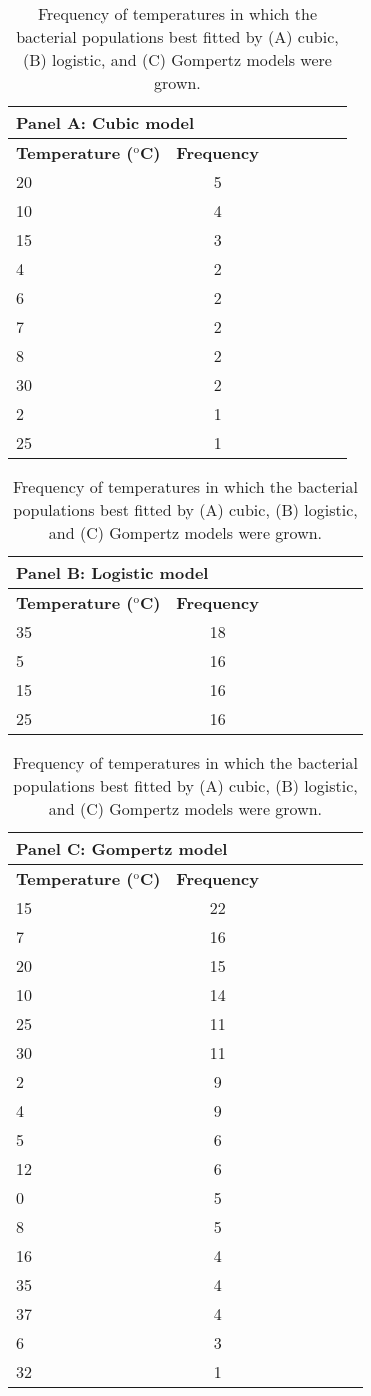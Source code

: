 \documentclass[11pt]{article}
\newcommand{\supersc}[1]{\ensuremath{^{\textrm{#1}}}}
\begin{document}
			\begin{table}[htbp]
		\caption{Frequency of temperatures in which the bacterial populations best fitted by (A) cubic, (B) logistic, and (C) Gompertz models were grown.}
		\label{table4}
		\begin{tabularx}{\linewidth}{l*{6}{c}}
			\toprule
			\multicolumn{7}{l}{\textbf{Panel A: Cubic model}} \\
			\midrule
			\textbf{Temperature (\supersc{o}C)} & \textbf{Frequency} \\
			20 & 5 \\
			10 & 4 \\
			15 & 3 \\
			4 & 2 \\
			6 & 2 \\
			7 & 2 \\
			8 & 2 \\
			30 & 2 \\
			2 & 1 \\
			25 & 1 \\
			\bottomrule   
		\end{tabularx}
		\begin{tabularx}{\linewidth}{l*{7}{c}}
			\toprule
			\multicolumn{7}{l}{\textbf{Panel B: Logistic model}} \\
			\midrule
			\textbf{Temperature (\supersc{o}C)} & \textbf{Frequency} \\
			35 & 18 \\
			5 & 16 \\
			15 & 16 \\
			25 & 16 \\
			\bottomrule
		\end{tabularx}
		\begin{tabularx}{\linewidth}{l*{7}{c}}
			\toprule
			\multicolumn{7}{l}{\textbf{Panel C: Gompertz model}} \\
			\midrule
			\textbf{Temperature (\supersc{o}C)} & \textbf{Frequency} \\
			15 & 22 \\
			7 & 16 \\
			20 & 15 \\
			10 & 14 \\
			25 & 11 \\
			30 & 11 \\
			2 & 9 \\
			4 & 9 \\
			5 & 6 \\
			12 & 6 \\
			0 & 5 \\
			8 & 5 \\
			16 & 4 \\
			35 & 4 \\
			37 & 4 \\
			6 & 3 \\
			32 & 1 \\
			\bottomrule
		\end{tabularx}
	\end{table}
	
\end{document}
